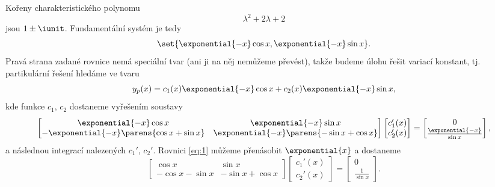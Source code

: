 \documentclass[answers]{exam}
\begin{document}
\begin{questions}
  \begin{solution}
  	Kořeny charakteristického polynomu
  	\begin{equation*}
  		\lambda^2 + 2 \lambda + 2
  	\end{equation*}
  	jsou $1 \pm \iunit$. Fundamentální systém je tedy
  	\begin{equation*}
	  	\set{\exponential{-x} \cos x, \exponential{-x} \sin x}.
  	\end{equation*}
  	Pravá strana zadané rovnice nemá speciální tvar (ani ji na něj nemůžeme převést), takže budeme úlohu řešit variací konstant, tj. partikulární řešení hledáme ve tvaru
  	\begin{equation*}
  		y_p(x) = c_1(x) \exponential{-x} \cos x + c_2(x) \exponential{-x} \sin x,
  	\end{equation*}
  	kde funkce $c_1$, $c_2$ dostaneme vyřešením soustavy
  	\begin{equation}
  		\label{eq:1}
  		\begin{bmatrix}
	  		\exponential{-x} \cos x & \exponential{-x} \sin x
	  		\\
	  		- \exponential{-x} \parens{\cos x + \sin x} & \exponential{-x} \parens{- \sin x + \cos x}
  		\end{bmatrix}
  		\begin{bmatrix}
  			c_1'(x)
  			\\
  			c_2'(x)
  		\end{bmatrix}
  		=
  		\begin{bmatrix}
  			0
  			\\
  			\frac{\exponential{-x}}{\sin x}
  		\end{bmatrix},
  	\end{equation}
  	a následnou integrací nalezených $c_1'$, $c_2'$. Rovnici \eqref{eq:1} můžeme přenásobit $\exponential{x}$ a dostaneme
  	\begin{equation*}
  		\begin{bmatrix}
	  		\cos x & \sin x
	  		\\
	  		- \cos x - \sin x & - \sin x + \cos x
  		\end{bmatrix}
  		\begin{bmatrix}
  			c_1'(x)
  			\\
  			c_2'(x)
  		\end{bmatrix}
  		=
  		\begin{bmatrix}
  			0
  			\\
  			\frac{1}{\sin x}
  		\end{bmatrix}.
  	\end{equation*}

\end{solution}
\end{questions}
\end{document}
